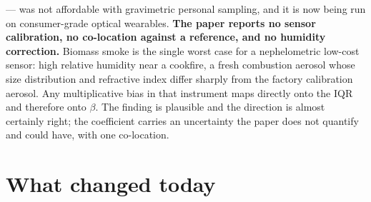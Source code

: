 \documentclass[10pt]{article}
\begin{document}
\begin{keybox}
--- was not affordable with gravimetric personal sampling, and it is now being run on
consumer-grade optical wearables. \textbf{The paper reports no sensor calibration, no
co-location against a reference, and no humidity correction.} Biomass smoke is the single
worst case for a nephelometric low-cost sensor: high relative humidity near a cookfire, a
fresh combustion aerosol whose size distribution and refractive index differ sharply from
the factory calibration aerosol. Any multiplicative bias in that instrument maps directly
onto the IQR and therefore onto $\beta$. The finding is plausible and the direction is
almost certainly right; the coefficient carries an uncertainty the paper does not quantify
and could have, with one co-location.\par
\end{keybox}

\vspace{3mm}

\section*{\sffamily\bfseries\color{Deep}What changed today}
\vspace{-1.5mm}{\color{Amber}\rule{\linewidth}{1.1pt}}\vspace{2.5mm}
\end{document}
